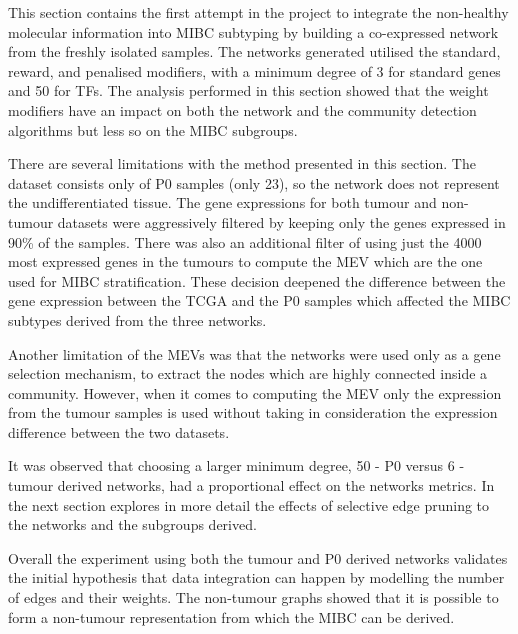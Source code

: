 This section contains the first attempt in the project to integrate the non-healthy molecular information into MIBC subtyping by building a co-expressed network from the freshly isolated samples. The networks generated utilised the standard, reward, and penalised modifiers, with a minimum degree of 3 for standard genes and 50 for TFs. The analysis performed in this section showed that the weight modifiers have an impact on both the network and the community detection algorithms but less so on the MIBC subgroups. 

There are several limitations with the method presented in this section. The dataset consists only of P0 samples (only 23), so the network does not represent the undifferentiated tissue. The gene expressions for both tumour and non-tumour datasets were aggressively filtered by keeping only the genes expressed in 90\% of the samples. There was also an additional filter of using just the 4000 most expressed genes in the tumours to compute the MEV which are the one used for MIBC stratification. These decision deepened the difference between the gene expression between the TCGA and the P0 samples which affected the MIBC subtypes derived from the three networks.

Another limitation of the MEVs was that the networks were used only as a gene selection mechanism, to extract the nodes which are highly connected inside a community. However, when it comes to computing the MEV only the expression from the tumour samples is used without taking in consideration the expression difference between the two datasets.

It was observed that choosing a larger minimum degree, 50 - P0 versus 6 - tumour derived networks, had a proportional effect on the networks metrics. In the next section explores in more detail the effects of selective edge pruning to the networks and the subgroups derived. 

Overall the experiment using both the tumour and P0 derived networks validates the initial hypothesis that data integration can happen by modelling the number of edges and their weights. The non-tumour graphs showed that it is possible to form a non-tumour representation from which the MIBC can be derived.




